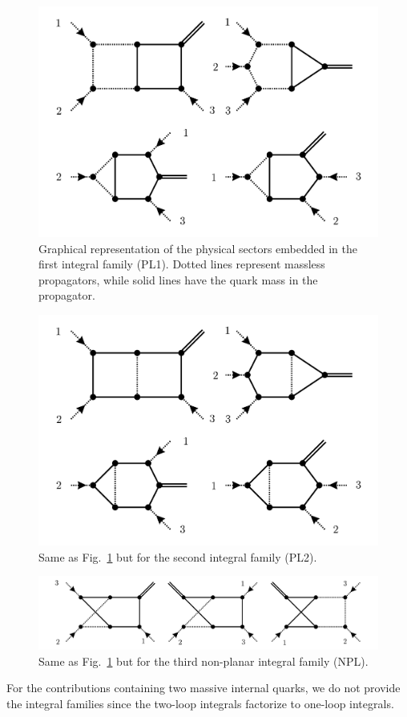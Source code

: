 \begin{figure}[ht]
\centering
\includegraphics[scale=0.3]{Images/NNLO_Feynman_diagrams/PL1.pdf}
\caption{Graphical representation of the physical sectors embedded in the first integral family (PL1). Dotted lines represent massless propagators, while solid lines have the quark mass in the propagator.} \label{fig:5:PL1}
\end{figure}
\begin{figure}[ht]
\centering
\includegraphics[scale=0.3]{Images/NNLO_Feynman_diagrams/PL2.pdf}
\caption{Same as Fig.~\ref{fig:5:PL1} but for the second integral family (PL2).} \label{fig:5:PL2}
\end{figure}
\begin{figure}[ht]
\centering
\includegraphics[scale=0.4]{Images/NNLO_Feynman_diagrams/NPL.pdf}
\caption{Same as Fig.~\ref{fig:5:PL1} but for the third non-planar integral family (NPL).} \label{fig:5:NPL}
\end{figure}
For the contributions containing two massive internal quarks, we do not provide the integral families since the two-loop integrals factorize to one-loop integrals.

